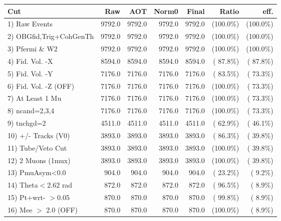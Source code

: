  \begin{table}[h!]\centering
 \begin{tabular}{||l||r|r|r|r|r|r||}
 \hline
 \hline
 Cut & Raw & AOT & Norm0 & Final & Ratio & eff.       \\
 \hline
  1) Raw Events           &       9792.0 &       9792.0 &       9792.0 &       9792.0 & (100.0\%) & (100.0\%) \\
  2) OBGfid,Trig+CohGenTh &       9792.0 &       9792.0 &       9792.0 &       9792.0 & (100.0\%) & (100.0\%) \\
  3) Pfermi \& W2         &       9792.0 &       9792.0 &       9792.0 &       9792.0 & (100.0\%) & (100.0\%) \\
  4) Fid. Vol. -X         &       8594.0 &       8594.0 &       8594.0 &       8594.0 & ( 87.8\%) & ( 87.8\%) \\
  5) Fid. Vol. -Y         &       7176.0 &       7176.0 &       7176.0 &       7176.0 & ( 83.5\%) & ( 73.3\%) \\
  6) Fid. Vol. -Z (OFF)   &       7176.0 &       7176.0 &       7176.0 &       7176.0 & (100.0\%) & ( 73.3\%) \\
  7) At Least 1 Mu        &       7176.0 &       7176.0 &       7176.0 &       7176.0 & (100.0\%) & ( 73.3\%) \\
  8) ncand=2,3,4          &       7176.0 &       7176.0 &       7176.0 &       7176.0 & (100.0\%) & ( 73.3\%) \\
  9) tnchgd=2             &       4511.0 &       4511.0 &       4511.0 &       4511.0 & ( 62.9\%) & ( 46.1\%) \\
 10) +/- Tracks (V0)      &       3893.0 &       3893.0 &       3893.0 &       3893.0 & ( 86.3\%) & ( 39.8\%) \\
 11) Tube/Veto Cut        &       3893.0 &       3893.0 &       3893.0 &       3893.0 & (100.0\%) & ( 39.8\%) \\
 12) 2 Muons (1mux)       &       3893.0 &       3893.0 &       3893.0 &       3893.0 & (100.0\%) & ( 39.8\%) \\
 13) PmuAsym<0.0          &        904.0 &        904.0 &        904.0 &        904.0 & ( 23.2\%) & (  9.2\%) \\
 14) Theta$<$2.62 rad     &        872.0 &        872.0 &        872.0 &        872.0 & ( 96.5\%) & (  8.9\%) \\
 15) Pt+wrt- $>$0.05      &        870.0 &        870.0 &        870.0 &        870.0 & ( 99.8\%) & (  8.9\%) \\
 16) Mee $>$ 2.0  (OFF)   &        870.0 &        870.0 &        870.0 &        870.0 & (100.0\%) & (  8.9\%) \\

\end{tabular}
\end{table}

